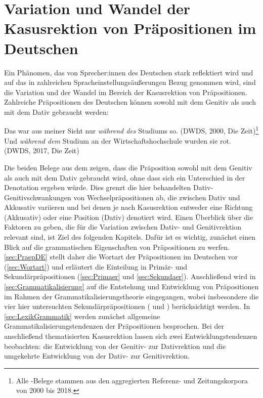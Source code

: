\chapter{Variation und Wandel der Kasusrektion von Präpositionen im Deutschen} \label{cha:SekPraeps}
Ein Phänomen, das von Sprecher:innen des Deutschen stark reflektiert wird und auf das in zahlreichen Spracheinstellungsäußerungen Bezug genommen wird, sind die Variation und der Wandel im Bereich der Kasusrektion von Präpositionen. 
Zahlreiche Präpositionen des Deutschen können sowohl mit dem Genitiv als auch mit dem Dativ gebraucht werden: 

\begin{exe}
\ex Das war aus meiner Sicht nur \emph{während des} Studiums so. (DWDS, 2000, Die Zeit)\footnote{Alle \citeauthor{DWDS}-Belege stammen aus den aggregierten Referenz- und Zeitungskorpora von 2000 bis 2018.}
\ex Und \emph{während dem} Studium an der Wirtschaftshochschule wurden sie rot. (DWDS, 2017, Die Zeit)
\end{exe}
Die beiden Belege aus dem \citeauthor{DWDS} zeigen, dass die Präposition \waehrend{} sowohl mit dem Genitiv als auch mit dem Dativ gebraucht wird, ohne dass sich ein Unterschied in der Denotation ergeben würde. 
Dies grenzt die hier behandelten Dativ-Genitivschwankungen von Wechselpräpositionen ab, die zwischen Dativ und Akkusativ variieren und bei denen je nach Kasusrektion entweder eine Richtung (Akkusativ) oder eine Position (Dativ) denotiert wird.  
Einen Überblick über die Faktoren zu geben, die für die Variation zwischen Dativ- und Genitivrektion relevant sind, ist Ziel des folgenden Kapitels. 
Dafür ist es wichtig, zunächst einen Blick auf die grammatischen Eigenschaften von Präpositionen zu werfen. 
\autoref{sec:PraepDE} stellt daher die Wortart der Präpositionen im Deutschen vor (\autoref{sec:Wortart}) und erläutert die Einteilung in Primär- und Sekundärpräpositionen (\autoref{sec:Primaer} und \autoref{sec:Sekundaer}). 
Anschließend wird in \autoref{sec:Grammatikalisierung} auf die Entstehung und Entwicklung von Präpositionen im Rahmen der Grammatikalisierungstheorie eingegangen, wobei insbesondere die vier hier untersuchten Sekundärpräpositionen ( und ) berücksichtigt werden. 
In \autoref{sec:LexikGrammatik} werden zunächst allgemeine Grammatikalisierungstendenzen der Präpositionen besprochen. 
Bei der anschließend thematisierten Kasusrektion lassen sich zwei Entwicklungstendenzen beobachten: die Entwicklung von der Genitiv- zur Dativrektion und die umgekehrte Entwicklung von der Dativ- zur Genitivrektion. 
